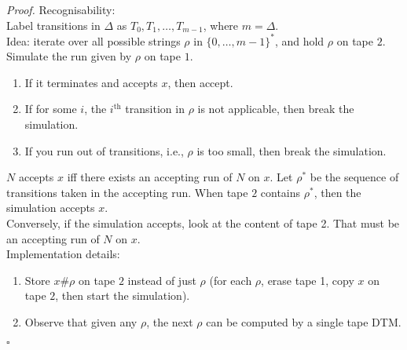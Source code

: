 \documentclass[a4paper]{article}
\newenvironment{proof}{\begin{breakbox}\textit{Proof.}}{\hfill$\square$\end{breakbox}}
\newcommand{\nl}{\vspace{0.2cm}\\}
\begin{document}
\begin{proof}
    Recognisability:\nl
    Label transitions in $\Delta$ as $T_0, T_1, \ldots, T_{m-1}$, where $m = \Delta$.\nl
    Idea: iterate over all possible strings $\rho$ in $\{0, \ldots, m - 1\}^*$, and hold $\rho$ on tape $2$.\nl
    Simulate the run given by $\rho$ on tape $1$.
    \begin{enumerate}
        \item If it terminates and accepts $x$, then accept.
        \item If for some $i$, the $i^\mathrm{th}$ transition in $\rho$ is not applicable, then break the simulation.
        \item If you run out of transitions, i.e., $\rho$ is too small, then break the simulation.
    \end{enumerate}
    $N$ accepts $x$ iff there exists an accepting run of $N$ on $x$. Let $\rho^*$ be the sequence of transitions taken in the accepting run. When tape $2$ contains $\rho^*$, then the simulation
    accepts $x$.\nl
    Conversely, if the simulation accepts, look at the content of tape 2. That must be an accepting run of $N$ on $x$.\nl
    Implementation details:
    \begin{enumerate}
        \item Store $x\#\rho$ on tape $2$ instead of just $\rho$ (for each $\rho$, erase tape 1, copy $x$ on tape $2$, then start the simulation).
        \item Observe that given any $\rho$, the next $\rho$ can be computed by a single tape DTM.
    \end{enumerate}
\end{proof}
\end{document}
